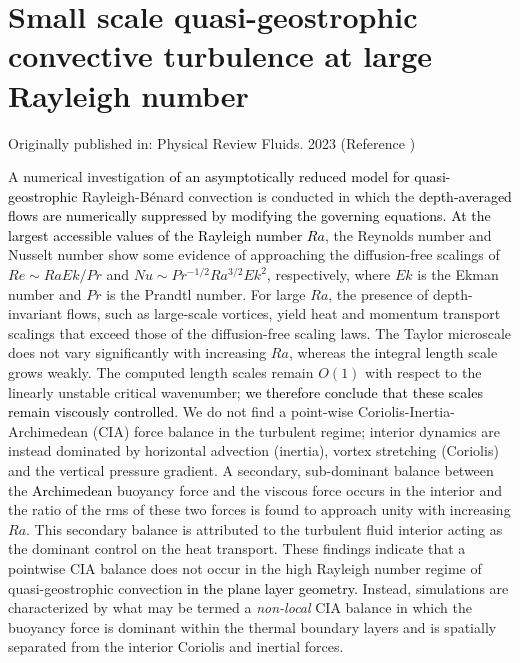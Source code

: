 \chapter{Small scale quasi-geostrophic convective turbulence at large Rayleigh number}
\label{Oliver_2023}

 \begin{affils}
 \end{affils}
 Originally published in:
 Physical Review Fluids. 2023 (Reference \citep{tO23})
\begin{chapterabstract}
	A numerical investigation \textcolor{black}{ of an asymptotically reduced model for quasi-geostrophic} Rayleigh-B\'enard convection is conducted in which the \textcolor{black}{depth-averaged flows are numerically suppressed by modifying the governing equations.} 
	\textcolor{black}{At the largest accessible values of the Rayleigh number $Ra$}, the Reynolds number and Nusselt number show some evidence of approaching the diffusion-free scalings of $Re \sim Ra Ek/Pr$ and $Nu \sim Pr^{-1/2} Ra^{3/2} Ek^2$, respectively, where $Ek$ is the Ekman number and $Pr$ is the Prandtl number.
For large $Ra$, the presence of depth-invariant flows, such as large-scale vortices, yield heat and momentum transport scalings that exceed those of the diffusion-free scaling laws.
The Taylor microscale does not vary significantly with increasing $Ra$, whereas the integral length scale grows weakly. 
The computed length scales remain $O(1)$ with respect to the linearly unstable critical wavenumber; \textcolor{black}{we therefore conclude that these scales remain viscously controlled}.
We do not find a point-wise Coriolis-Inertia-Archimedean (CIA) force balance in the turbulent regime; interior dynamics are instead dominated by horizontal advection (inertia), vortex stretching (Coriolis) and the vertical pressure gradient. 
A secondary, sub-dominant balance between the \textcolor{black}{Archimedean} buoyancy force and the viscous force occurs in the interior and the ratio of the rms of these two forces is found to approach unity with increasing $Ra$. This secondary balance is attributed to the turbulent fluid interior acting as the dominant control on the heat transport. These findings indicate that a pointwise CIA balance does not occur in the high Rayleigh number regime of quasi-geostrophic convection \textcolor{black}{in the plane layer geometry.} 
Instead, simulations are characterized by what may be termed a \textsl{non-local} CIA balance in which the buoyancy force is dominant within the thermal boundary layers and is spatially separated from the interior Coriolis and inertial forces.


\end{chapterabstract}



